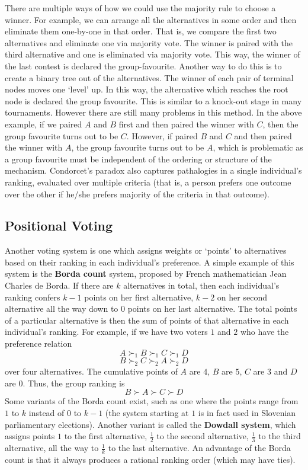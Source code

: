 \documentclass{article}
\theoremstyle{definition}
\begin{document}
There are multiple ways of how we could use the majority rule to choose a winner. For example, we can arrange all the alternatives in some order and then eliminate them one-by-one in that order. That is, we compare the first two alternatives and eliminate one via majority vote. The winner is paired with the third alternative and one is eliminated via majority vote. This way, the winner of the last contest is declared the group-favourite. Another way to do this is to create a binary tree out of the alternatives. The winner of each pair of terminal nodes moves one `level' up. In this way, the alternative which reaches the root node is declared the group favourite. This is similar to a knock-out stage in many tournaments. However there are still many problems in this method. In the above example, if we paired $A$ and $B$ first and then paired the winner with $C$, then the group favourite turns out to be $C$. However, if paired $B$ and $C$ and then paired the winner with $A$, the group favourite turns out to be $A$, which is problematic as a group favourite must be independent of the ordering or structure of the mechanism. Condorcet's paradox also captures pathalogies in a single individual's ranking, evaluated over multiple criteria (that is, a person prefers one outcome over the other if he/she prefers majority of the criteria in that outcome).

\subsection{Positional Voting}

Another voting system is one which assigns weights or `points' to alternatives based on their ranking in each individual's preference. A simple example of this system is the \textbf{Borda count} system, proposed by French mathematician Jean Charles de Borda. If there are $k$ alternatives in total, then each individual's ranking confers $k-1$ points on her first alternative, $k-2$ on her second alternative all the way down to $0$ points on her last alternative. The total points of a particular alternative is then the sum of points of that alternative in each individual's ranking. For example, if we have two voters $1$ and $2$ who have the preference relation
\[
    A \succ_1 B \succ_1 C \succ_1 D
\]
\[
    B \succ_2 C \succ_2 A \succ_2 D
\]
over four alternatives. The cumulative points of $A$ are $4$, $B$ are $5$, $C$ are $3$ and $D$ are $0$. Thus, the group ranking is
\[
    B \succ A \succ C \succ D
\]
Some variants of the Borda count exist, such as one where the points range from $1$ to $k$ instead of $0$ to $k-1$ (the system starting at $1$ is in fact used in Slovenian parliamentary elections). Another variant is called the \textbf{Dowdall system}, which assigns points $1$ to the first alternative, $\frac{1}{2}$ to the second alternative, $\frac{1}{3}$ to the third alternative, all the way to $\frac{1}{k}$ to the last alternative. An advantage of the Borda count is that it always produces a rational ranking order (which may have ties). \medskip
\end{document}
